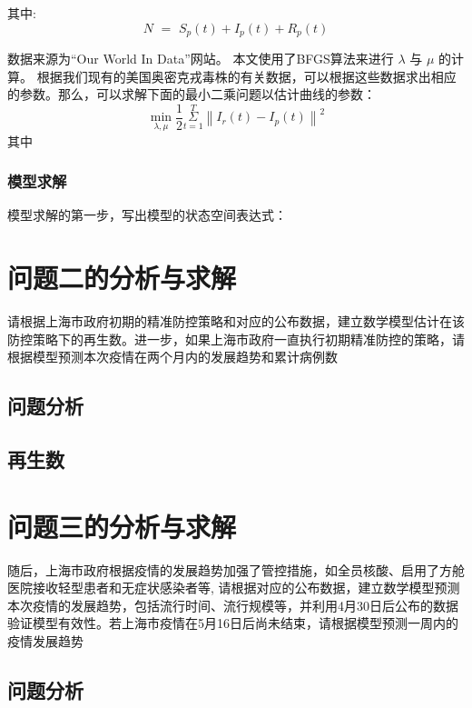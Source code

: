 \documentclass[bwprint]{gmcmthesis}
\numberwithin{figure}{section}
\begin{document}
其中:
\begin{equation} \label{}
    N\,\,=\,\,S_p\left( t \right) +I_p\left( t \right) +R_p\left( t \right) 
\end{equation}

\par
数据来源为“Our World In Data”网站。
本文使用了BFGS算法来进行 $\lambda$ 与 $\mu$ 的计算。
根据我们现有的美国奥密克戎毒株的有关数据，可以根据这些数据求出相应的参数。那么，可以求解下面的最小二乘问题以估计曲线的参数：
\begin{equation} \label{}
    \underset{\lambda ,\mu}{\min}\frac{1}{2}\underset{t=1}{\overset{T}{\varSigma}}\left\| I_r\left( t \right) -I_p\left( t \right) \right\| ^2
\end{equation}
其中

\subsubsection{模型求解}
模型求解的第一步，写出模型的状态空间表达式：


\section{问题二的分析与求解}
请根据上海市政府初期的精准防控策略和对应的公布数据，建立数学模型估计在该防控策略下的再生数。进一步，如果上海市政府一直执行初期精准防控的策略，请根据模型预测本次疫情在两个月内的发展趋势和累计病例数
\subsection{问题分析}
\subsection{再生数}


\section{问题三的分析与求解}
随后，上海市政府根据疫情的发展趋势加强了管控措施，如全员核酸、启用了方舱医院接收轻型患者和无症状感染者等, 请根据对应的公布数据，建立数学模型预测本次疫情的发展趋势，包括流行时间、流行规模等，并利用4月30日后公布的数据验证模型有效性。若上海市疫情在5月16日后尚未结束，请根据模型预测一周内的疫情发展趋势
\subsection{问题分析}
\end{document}
